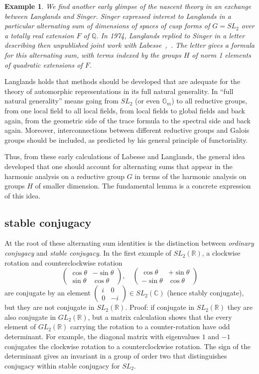 \documentclass[brochure,english,12pt]{bourbaki}
\newtheorem{example}[equation]{Example}
\newcommand{\ring}[1]{\mathbb{#1}}
\begin{document}
\begin{example}
  We find another early glimpse of the nascent theory in an exchange
  between Langlands and Singer.  Singer expressed interest to
  Langlands in a particular alternating sum of dimensions of spaces of
  cusp forms of $G=SL_2$ over a totally real extension $F$ of
  $\ring{Q}$.  In 1974, Langlands replied to Singer in a letter
  describing then unpublished joint work with
  Labesse~\cite{Singer},~\cite{LL}.  The letter gives a formula for
  this alternating sum, with terms indexed by the groups $H$ of norm 1
  elements of quadratic extensions of $F$.
\end{example}

Langlands holds that  methods should be developed that are adequate for the
theory of automorphic representations in its full natural generality.
In ``full natural generality'' means going from $SL_2$ (or even
$\ring{G}_m$) to all reductive groups, from one local field to all
local fields, from local fields to global fields and back again, from
the geometric side of the trace formula to the spectral side and back
again.  Moreover,  interconnections between different reductive
groups and Galois groups should be included, as predicted by his
general principle of functoriality.

Thus, from these early calculations of Labesse and Langlands, the
general idea developed that one should account for alternating sums
that appear in the harmonic analysis on a reductive group $G$ in terms
of the harmonic analysis on groups $H$ of smaller dimension. 
The fundamental lemma is a concrete expression of this idea. 


\subsection{stable conjugacy}

At the root of these alternating sum identities is the distinction between
{\it ordinary conjugacy} and {\it stable conjugacy}.  In the first example of $SL_2(\ring{R})$,
a clockwise rotation and counterclockwise rotation
\[
\begin{pmatrix}\cos\theta &-\sin\theta\\\sin\theta &\cos\theta\end{pmatrix},\quad
\begin{pmatrix}\cos\theta &+\sin\theta\\-\sin\theta &\cos\theta\end{pmatrix}
\]
are conjugate by an element $\begin{pmatrix}i&0\\0&-i\end{pmatrix}\in
SL_2(\ring{C})$ (hence stably conjugate), but they are not conjugate
in $SL_2(\ring{R})$.  Proof: if conjugate in $SL_2(\ring{R})$ they are
also conjugate in $GL_2(\ring{R})$, but a matrix calculation shows
that the every element of $GL_2(\ring{R})$ carrying the rotation to a
counter-rotation have odd determinant.  For example, the diagonal
matrix with eigenvalues $1$ and $-1$ conjugates the clockwise rotation
to a counterclockwise rotation.  The sign of the determinant gives an
invariant in a group of order two that distinguishes conjugacy within
stable conjugacy for $SL_2$.
\end{document}
